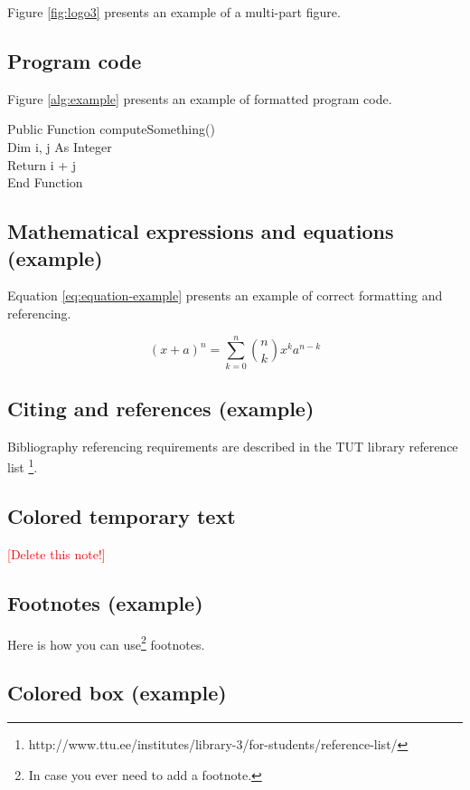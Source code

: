 Figure \ref{fig:logo3} presents an example of a multi-part figure.

\subsection{Program code}

Figure \ref{alg:example} presents an example of formatted program
code.

\begin{algorithm}[!ht]
  Public Function computeSomething() \\
  Dim i, j As Integer\\
  Return i + j\\
  End Function\\
  \label{alg:example}
\end{algorithm}


\subsection{Mathematical expressions and equations (example)}

Equation \ref{eq:equation-example} presents an example of correct
formatting and referencing.

\begin{equation} \label{eq:equation-example}
  (x+a)^n = \sum_{k=0}^{n} {n \choose k} x^ka^{n-k}
\end{equation}


\subsection{Citing and references (example)}

 Bibliography referencing requirements are described in the TUT
library reference list
\footnote{http://www.ttu.ee/institutes/library-3/for-students/reference-list/}.

\subsection{Colored temporary text}

\textcolor{red}{[Delete this note!]}

\subsection{Footnotes (example)}

Here is how you can use\footnote{In case you ever need to add a footnote.} footnotes.

\subsection{Colored box (example)}

\begin{tcolorbox}[arc=0pt, outer arc=0pt, boxrule=0pt, left=0mm]
\blindtext
\end{tcolorbox}
